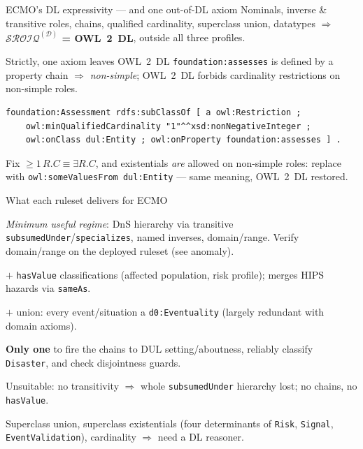 \documentclass[10pt,aspectratio=169,xcolor=table]{beamer}
\newcommand{\dl}[1]{\ensuremath{\mathcal{#1}}}
\newcommand{\SROIQ}{\dl{SROIQ}}
\newcommand{\hl}[1]{\textcolor{accent}{\textbf{#1}}}
\begin{document}
\begin{frame}[fragile]{ECMO's DL expressivity --- and one out-of-DL axiom}
  \small
  Nominals, inverse \& transitive roles, chains, qualified cardinality, superclass union,
  datatypes $\Rightarrow$ \hl{$\SROIQ^{(\mathcal{D})}$ = OWL~2~DL}, outside all three profiles.
  \vspace{0.5em}
  \begin{alertblock}{Strictly, one axiom leaves OWL~2~DL}
    \texttt{foundation:assesses} is defined by a property chain $\Rightarrow$ \emph{non-simple};
    OWL~2~DL forbids cardinality restrictions on non-simple roles.
\begin{lstlisting}
foundation:Assessment rdfs:subClassOf [ a owl:Restriction ;
    owl:minQualifiedCardinality "1"^^xsd:nonNegativeInteger ;
    owl:onClass dul:Entity ; owl:onProperty foundation:assesses ] .
\end{lstlisting}
  \end{alertblock}
  \begin{block}{Fix}
    ${\geq}1\,R.C \equiv \exists R.C$, and existentials \emph{are} allowed on non-simple roles:
    replace with \texttt{owl:someValuesFrom dul:Entity} --- same meaning, OWL~2~DL restored.
  \end{block}
\end{frame}

\begin{frame}{What each ruleset delivers for ECMO}
  \small
  \begin{description}[OWL 2 RL]
    \item[RDFS-Plus] \emph{Minimum useful regime}: DnS hierarchy via transitive
      \texttt{subsumedUnder}/\texttt{specializes}, named inverses, domain/range.
      Verify domain/range on the deployed ruleset (see anomaly).
    \item[OWL-Horst] $+$ \texttt{hasValue} classifications (affected population, risk
      profile); merges HIPS hazards via \texttt{sameAs}.
    \item[OWL-Max] $+$ union: every event/situation a \texttt{d0:Eventuality} (largely
      redundant with domain axioms).
    \item[OWL 2 RL] \hl{Only one} to fire the chains to DUL setting/aboutness, reliably
      classify \texttt{Disaster}, and check disjointness guards.
    \item[OWL 2 QL] \textcolor{nored}{Unsuitable}: no transitivity $\Rightarrow$ whole
      \texttt{subsumedUnder} hierarchy lost; no chains, no \texttt{hasValue}.
    \item[None] Superclass union, superclass existentials (four determinants of
      \texttt{Risk}, \texttt{Signal}, \texttt{EventValidation}), cardinality
      $\Rightarrow$ need a DL reasoner.
  \end{description}
\end{frame}
\end{document}
